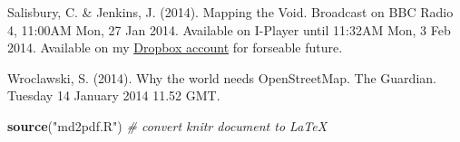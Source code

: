 \documentclass[]{article}
\newenvironment{Shaded}{}{}
\newcommand{\KeywordTok}[1]{\textcolor[rgb]{0.00,0.44,0.13}{\textbf{{#1}}}}
\newcommand{\StringTok}[1]{\textcolor[rgb]{0.25,0.44,0.63}{{#1}}}
\newcommand{\CommentTok}[1]{\textcolor[rgb]{0.38,0.63,0.69}{\textit{{#1}}}}
\newcommand{\NormalTok}[1]{{#1}}
\begin{document}
Salisbury, C. \& Jenkins, J. (2014). Mapping the Void. Broadcast on BBC
Radio 4, 11:00AM Mon, 27 Jan 2014. Available on I-Player until 11:32AM
Mon, 3 Feb 2014. Available on my
\href{https://dl.dropboxusercontent.com/u/15008199/egs2stay/Mapping\_the\_Void\_-\_Mapping\_the\_Void\_b03s6mf0\_default.m4a}{Dropbox
account} for forseable future.

Wroclawski, S. (2014). Why the world needs OpenStreetMap. The Guardian.
Tuesday 14 January 2014 11.52 GMT.

\begin{Shaded}
\begin{Highlighting}[]
\KeywordTok{source}\NormalTok{(}\StringTok{"md2pdf.R"}\NormalTok{)  }\CommentTok{# convert knitr document to LaTeX}
\end{Highlighting}
\end{Shaded}
\end{document}
